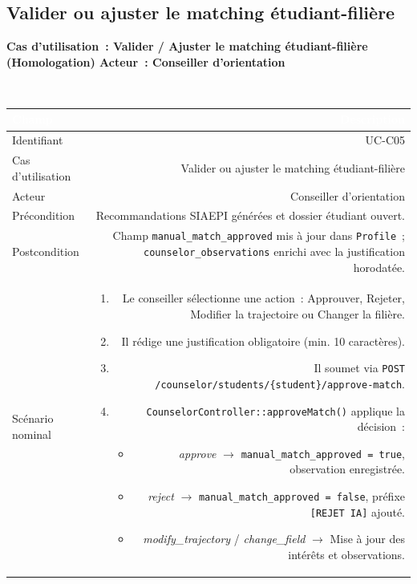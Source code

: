 \documentclass[a4paper,12pt]{article}
\newcommand{\ucheader}[2]{%
  \noindent\colorbox{capblue}{\parbox{\dimexpr\linewidth-2\fboxsep}{%
    \color{white}\bfseries\large Cas d'utilisation~: #1 \hfill \normalsize Acteur~: #2
  }}\\[2pt]
}
\begin{document}
\vspace{1em}

\subsection{Valider ou ajuster le matching étudiant-filière}
\ucheader{Valider / Ajuster le matching étudiant-filière (Homologation)}{Conseiller d'orientation}

\noindent
\begin{tabular}{|L|R|}
\hline
{}\textcolor{white}{\textbf{Champ}} & \textcolor{white}{\textbf{Description}} \\
\hline
{}Identifiant & UC-C05 \\
\hline
Cas d'utilisation & Valider ou ajuster le matching étudiant-filière \\
\hline
{}Acteur & Conseiller d'orientation \\
\hline
Précondition & Recommandations SIAEPI générées et dossier étudiant ouvert. \\
\hline
{}Postcondition & Champ \texttt{manual\_match\_approved} mis à jour dans \texttt{Profile}~; \texttt{counselor\_observations} enrichi avec la justification horodatée. \\
\hline
Scénario nominal &
\begin{enumerate}
  \item Le conseiller sélectionne une action~: Approuver, Rejeter, Modifier la trajectoire ou Changer la filière.
  \item Il rédige une justification obligatoire (min. 10 caractères).
  \item Il soumet via \texttt{POST /counselor/students/\{student\}/approve-match}.
  \item \texttt{CounselorController::approveMatch()} applique la décision~:
  \begin{itemize}
    \item \textit{approve} $\rightarrow$ \texttt{manual\_match\_approved = true}, observation enregistrée.
    \item \textit{reject} $\rightarrow$ \texttt{manual\_match\_approved = false}, préfixe \texttt{[REJET IA]} ajouté.
    \item \textit{modify\_trajectory} / \textit{change\_field} $\rightarrow$ Mise à jour des intérêts et observations.
  \end{itemize}

\end{enumerate}
\end{tabular}
\end{document}

